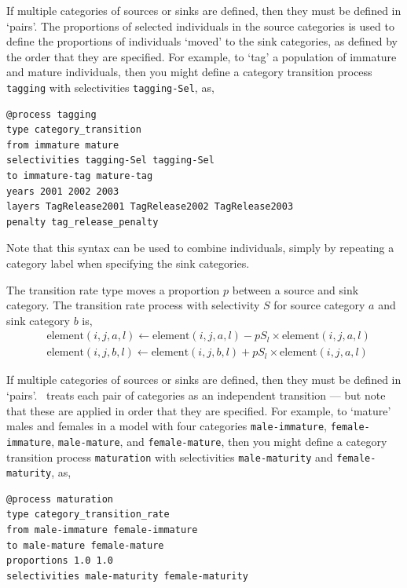 If multiple categories of sources or sinks are defined, then they must be defined in `pairs'. The proportions of selected individuals in the source categories is used to define the proportions of individuals `moved' to the sink categories, as defined by the order that they are specified. For example, to `tag' a population of immature and mature individuals, then you might define a category transition process \texttt{tagging} with selectivities \texttt{tagging-Sel}, as,

\begin{verbatim}
@process tagging
type category_transition
from immature mature
selectivities tagging-Sel tagging-Sel
to immature-tag mature-tag
years 2001 2002 2003
layers TagRelease2001 TagRelease2002 TagRelease2003
penalty tag_release_penalty
\end{verbatim}

Note that this syntax can be used to combine individuals, simply by repeating a category label when specifying the sink categories.

The transition rate type moves a proportion $p$ between a source and sink category. The transition rate process with selectivity $S$ for source category $a$ and sink category $b$ is,
\begin{equation}\begin{split}
  & \text{element}(i,j,a,l) \leftarrow \text{element}(i,j,a,l) - pS_l \times \text{element}(i,j,a,l) \\
  & \text{element}(i,j,b,l) \leftarrow \text{element}(i,j,b,l) + pS_l \times \text{element}(i,j,a,l)
\end{split}\end{equation}

If multiple categories of sources or sinks are defined, then they must be defined in `pairs'. \SPM\ treats each pair of categories as an independent transition --- but note that these are applied in order that they are specified. For example, to `mature' males and females in a model with four categories \texttt{male-immature}, \texttt{female-immature}, \texttt{male-mature}, and \texttt{female-mature}, then you might define a category transition process \texttt{maturation} with selectivities \texttt{male-maturity} and \texttt{female-maturity}, as,

\begin{verbatim}
@process maturation
type category_transition_rate
from male-immature female-immature
to male-mature female-mature
proportions 1.0 1.0
selectivities male-maturity female-maturity
\end{verbatim}

